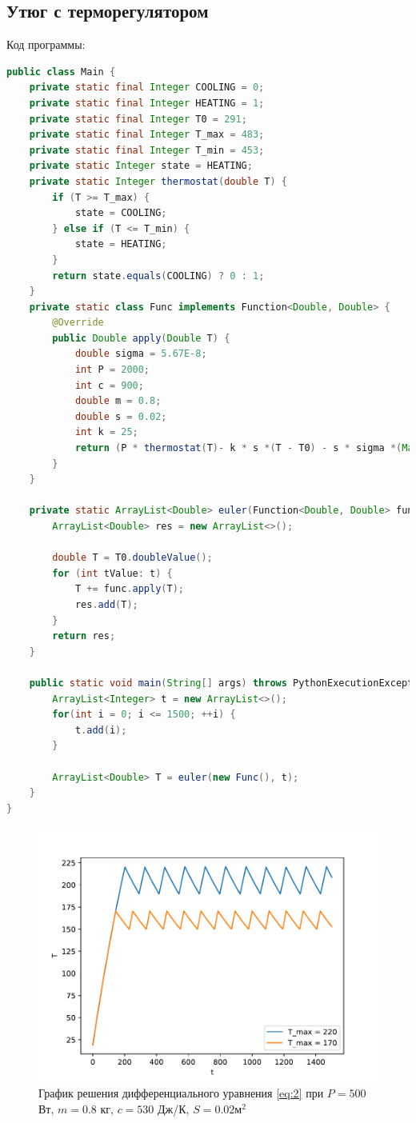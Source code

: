 \documentclass[a4paper, 14pt]{extarticle}
\begin{document}
		\subsection{Утюг с терморегулятором}
			Код программы:
			\begin{lstlisting}[language=Java]
public class Main {
	private static final Integer COOLING = 0;
	private static final Integer HEATING = 1;
	private static final Integer T0 = 291;
	private static final Integer T_max = 483;
	private static final Integer T_min = 453;
	private static Integer state = HEATING;
	private static Integer thermostat(double T) {
		if (T >= T_max) {
			state = COOLING;
		} else if (T <= T_min) {
			state = HEATING;
		}
		return state.equals(COOLING) ? 0 : 1;
	}
	private static class Func implements Function<Double, Double> {
		@Override
		public Double apply(Double T) {
			double sigma = 5.67E-8;
			int P = 2000;
			int c = 900;
			double m = 0.8;
			double s = 0.02;
			int k = 25;
			return (P * thermostat(T)- k * s *(T - T0) - s * sigma *(Math.pow(T, 4) - Math.pow(T0, 4))) / (c * m);
		}
	}
	
	private static ArrayList<Double> euler(Function<Double, Double> func, ArrayList<Integer> t) {
		ArrayList<Double> res = new ArrayList<>();
		
		double T = T0.doubleValue();
		for (int tValue: t) {
			T += func.apply(T);
			res.add(T);
		}
		return res;
	}
	
	public static void main(String[] args) throws PythonExecutionException, IOException {
		ArrayList<Integer> t = new ArrayList<>();
		for(int i = 0; i <= 1500; ++i) {
			t.add(i);
		}
		
		ArrayList<Double> T = euler(new Func(), t);
	}
}
			\end{lstlisting}
			\begin{figure}[H]
				\centering
				\includegraphics[width = .65\linewidth]{fig2.pdf}
				\caption[.] {График решения дифференциального уравнения \eqref{eq:2} 
				при $P = 500$ Вт, $m = 0.8$ кг, $c = 530$ Дж/К, $S = 0.02 \text{м}^2$}
			\end{figure}
			
\end{document}
